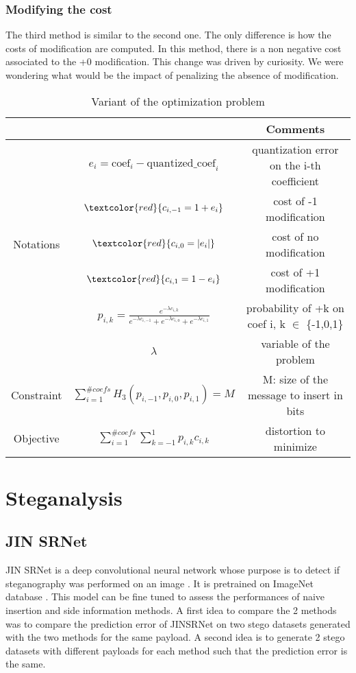 \documentclass[12pt]{article}
\begin{document}
\subsubsection{Modifying the cost}
The third method is similar to the second one. The only difference is how the costs of modification are computed. In this method, there is a non negative cost associated to the +0 modification. This change was driven by curiosity. We were wondering what would be the impact of penalizing the absence of modification.
\begin{table}[H]
\begin{tabular}{ |c|c|c| }
    \hline
    &  & Comments\\
    \hline
    & $e_i = \text{coef}_i - \text{quantized\_coef}_i$ & quantization error on the i-th coefficient\\ 
    & $\textcolor{red}{c_{i,-1} = 1 + e_i}$ & cost of -1 modification\\ 
    Notations & $\textcolor{red}{c_{i,0} = |e_i|}$ & cost of no modification\\
    & $\textcolor{red}{c_{i,1} = 1 - e_i}$ & cost of +1 modification\\
    & $p_{i,k} = \frac{e^{-\lambda c_{i,k}}}{e^{-\lambda c_{i,-1}} + e^{-\lambda c_{i,0}} + e^{-\lambda c_{i,1}}}$ & probability of +k on coef i, k $\in$ \{-1,0,1\}\\
    & $\lambda$ & variable of the problem\\
    \hline
    Constraint & $\displaystyle\sum_{i=1}^{\# coefs}{H_3(p_{i,-1},p_{i,0},p_{i,1})} = M$ & M: size of the message to insert in bits\\
    \hline
    Objective & $\displaystyle\sum_{i=1}^{\# coefs}{\sum_{k=-1}^{1}{p_{i,k}c_{i,k}}}$ & distortion to minimize \\ 
    \hline
\end{tabular}
\caption[Side information variant]{Variant of the optimization problem}
\end{table}

\section{Steganalysis}
\subsection{JIN SRNet}
JIN SRNet is a deep convolutional neural network whose purpose is to detect if steganography was performed on an image \autocite{liuLosslessImageSteganography2022}. It is pretrained on ImageNet database \autocite{butoraRevisitingPerturbedQuantization2021}. This model can be fine tuned to assess the performances of naive insertion and side information methods. A first idea to compare the 2 methods was to compare the prediction error of JINSRNet on two stego datasets generated with the two methods for the same payload. A second idea is to generate 2 stego datasets with different payloads for each method such that the prediction error is the same. 
\end{document}
